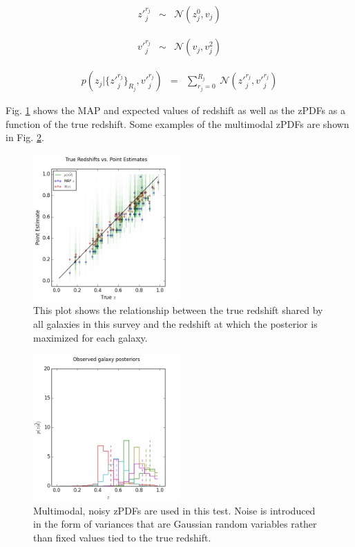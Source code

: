 \documentclass[preprint]{aastex}
\begin{document}
\begin{eqnarray}
\label{eq:zshift-milti}
z'^{r_{j}}_{j} &\sim& \mathcal{N}(z_{j}^{0},v_{j})
\end{eqnarray}

\begin{eqnarray}
\label{eq:znoise-multi}
v'^{r_{j}}_{j} &\sim& \mathcal{N}(v_{j},v^{2}_{j})
\end{eqnarray}

\begin{eqnarray}
\label{eq:zmany}
p(z_{j}|\{z'^{r_{j}}_{j}\}_{R_{j}},v'^{r_{j}}_{j}) &=& \sum_{r_{j}=0}^{R_{j}}\ \mathcal{N}(z'^{r_{j}}_{j},v'^{r_{j}}_{j})
\end{eqnarray}

Fig. \ref{fig:multicat} shows the MAP and expected values of redshift as well as the zPDFs as a function of the true redshift.  Some examples of the multimodal zPDFs are shown in Fig. \ref{fig:multipzs}.

\begin{figure}
\includegraphics[width=0.5\textwidth]{multi/truevmap.png}
\caption{This plot shows the relationship between the true redshift shared by all galaxies in this survey and the redshift at which the posterior is maximized for each galaxy.}
\label{fig:multicat}
\end{figure}

\begin{figure}
\includegraphics[width=0.5\textwidth]{multi/samplepzs.png}
\caption{Multimodal, noisy zPDFs are used in this test.  Noise is introduced in the form of variances that are Gaussian random variables rather than fixed values tied to the true redshift.}
\label{fig:multipzs}
\end{figure}
\end{document}
